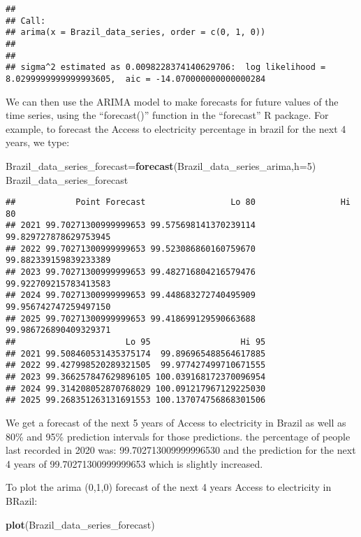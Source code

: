 \documentclass[
]{article}
\newenvironment{Shaded}{\begin{snugshade}}{\end{snugshade}}
\newcommand{\AttributeTok}[1]{\textcolor[rgb]{0.13,0.29,0.53}{#1}}
\newcommand{\DecValTok}[1]{\textcolor[rgb]{0.00,0.00,0.81}{#1}}
\newcommand{\FunctionTok}[1]{\textcolor[rgb]{0.13,0.29,0.53}{\textbf{#1}}}
\newcommand{\NormalTok}[1]{#1}
\newcommand{\OtherTok}[1]{\textcolor[rgb]{0.56,0.35,0.01}{#1}}
\begin{document}
\begin{verbatim}
## 
## Call:
## arima(x = Brazil_data_series, order = c(0, 1, 0))
## 
## 
## sigma^2 estimated as 0.0098228374140629706:  log likelihood = 8.0299999999999993605,  aic = -14.070000000000000284
\end{verbatim}

We can then use the ARIMA model to make forecasts for future values of
the time series, using the ``forecast()'' function in the ``forecast'' R
package. For example, to forecast the Access to electricity percentage
in brazil for the next 4 years, we type:

\begin{Shaded}
\begin{Highlighting}[]
\NormalTok{Brazil\_data\_series\_forecast}\OtherTok{=}\FunctionTok{forecast}\NormalTok{(Brazil\_data\_series\_arima,}\AttributeTok{h=}\DecValTok{5}\NormalTok{)}
\NormalTok{Brazil\_data\_series\_forecast}
\end{Highlighting}
\end{Shaded}

\begin{verbatim}
##            Point Forecast                 Lo 80                 Hi 80
## 2021 99.70271300999999653 99.575698141370239114 99.829727878629753945
## 2022 99.70271300999999653 99.523086860160759670 99.882339159839233389
## 2023 99.70271300999999653 99.482716804216579476 99.922709215783413583
## 2024 99.70271300999999653 99.448683272740495909 99.956742747259497150
## 2025 99.70271300999999653 99.418699129590663688 99.986726890409329371
##                      Lo 95                  Hi 95
## 2021 99.508460531435375174  99.896965488564617885
## 2022 99.427998520289321505  99.977427499710671555
## 2023 99.366257847629896105 100.039168172370096954
## 2024 99.314208052870768029 100.091217967129225030
## 2025 99.268351263131691553 100.137074756868301506
\end{verbatim}

We get a forecast of the next 5 years of Access to electricity in Brazil
as well as 80\% and 95\% prediction intervals for those predictions. the
percentage of people last recorded in 2020 was: 99.702713009999996530
and the prediction for the next 4 years of 99.70271300999999653 which is
slightly increased.

To plot the arima (0,1,0) forecast of the next 4 years Access to
electricity in BRazil:

\begin{Shaded}
\begin{Highlighting}[]
\FunctionTok{plot}\NormalTok{(Brazil\_data\_series\_forecast)}
\end{Highlighting}
\end{Shaded}
\end{document}
